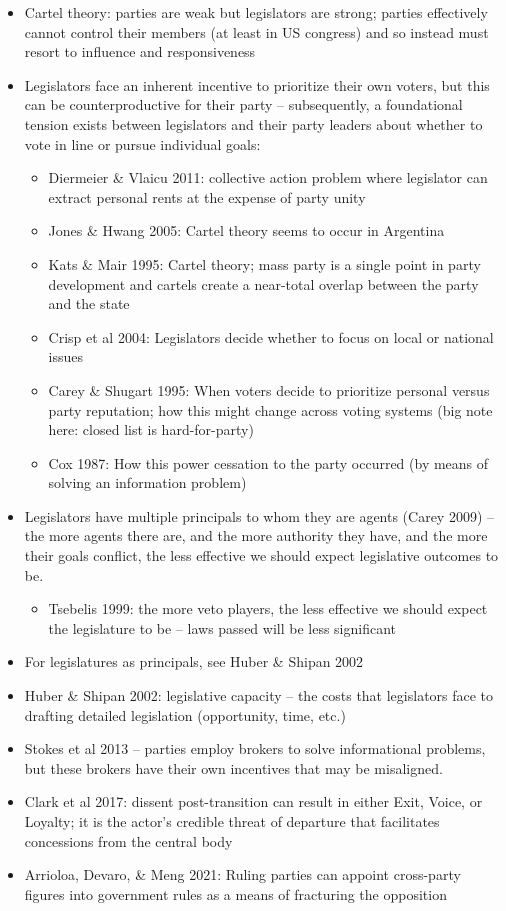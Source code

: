 \documentclass[12pt]{article}
\begin{document}
\begin{itemize}
    \item Cartel theory: parties are weak but legislators are strong; parties effectively cannot control their members (at least in US congress) and so instead must resort to influence and responsiveness
    \item Legislators face an inherent incentive to prioritize their own voters, but this can be counterproductive for their party -- subsequently, a foundational tension exists between legislators and their party leaders about whether to vote in line or pursue individual goals:
    \begin{itemize}
        \item Diermeier \& Vlaicu 2011: collective action problem where legislator can extract personal rents at the expense of party unity
        \item Jones \& Hwang 2005: Cartel theory seems to occur in Argentina
        \item Kats \& Mair 1995: Cartel theory; mass party is a single point in party development and cartels create a near-total overlap between the party and the state
        \item Crisp et al 2004: Legislators decide whether to focus on local or national issues
        \item Carey \& Shugart 1995: When voters decide to prioritize personal versus party reputation; how this might change across voting systems (big note here: closed list is hard-for-party)
        \item Cox 1987: How this power cessation to the party occurred (by means of solving an information problem)
    \end{itemize}
    \item Legislators have multiple principals to whom they are agents (Carey 2009) -- the more agents there are, and the more authority they have, and the more their goals conflict, the less effective we should expect legislative outcomes to be.
    \begin{itemize}
        \item Tsebelis 1999: the more veto players, the less effective we should expect the legislature to be -- laws passed will be less significant
    \end{itemize}
    \item For legislatures as principals, see Huber \& Shipan 2002
    \item Huber \& Shipan 2002: legislative capacity -- the costs that legislators face to drafting detailed legislation (opportunity, time, etc.)
    \item Stokes et al 2013 -- parties employ brokers to solve informational problems, but these brokers have their own incentives that may be misaligned.
    \item Clark et al 2017: dissent post-transition can result in either Exit, Voice, or Loyalty; it is the actor's credible threat of departure that facilitates concessions from the central body
    \item Arrioloa, Devaro, \& Meng 2021: Ruling parties can appoint cross-party figures into government rules as a means of fracturing the opposition
\end{itemize}
\end{document}

